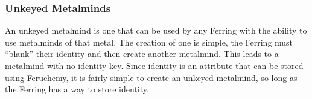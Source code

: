 \documentclass[conference]{IEEEtran}
\begin{document}
\subsubsection*{\textbf{Unkeyed Metalminds}}\hfill\break\indent
An unkeyed metalmind is one that can be used by any Ferring with the ability to use metalminds of that metal.\cite{BoM-CH3}  The creation of one is simple, the Ferring must ``blank'' their identity and then create another metalmind.  This leads to a metalmind with no identity key.  Since identity is an attribute that can be stored using Feruchemy, it is fairly simple to create an unkeyed metalmind, so long as the Ferring has a way to store identity.\cite{BoM-CH3}
\hfill\break
\begin{table}[!hb]
	

\end{table}
\end{document}
